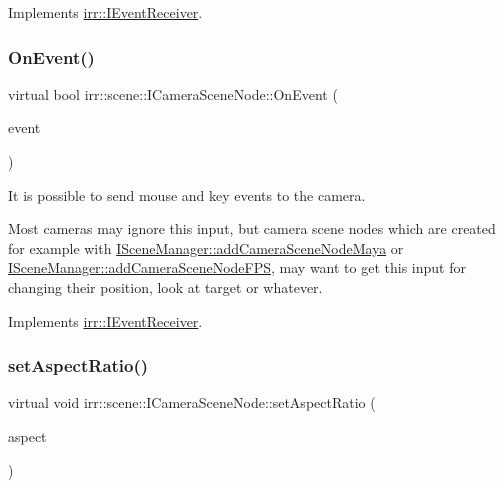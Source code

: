 Implements \hyperlink{classirr_1_1IEventReceiver_a571f744ceffc3b4fe8a81f529163eb97}{irr\+::\+I\+Event\+Receiver}.

\mbox{\label{classirr_1_1scene_1_1ICameraSceneNode_af27145518f43a17f803cdea086f68f3c}} 
\subsubsection{\texorpdfstring{On\+Event()}{OnEvent()}\hspace{0.1cm}{\footnotesize\ttfamily [2/2]}}
{\footnotesize\ttfamily virtual bool irr\+::scene\+::\+I\+Camera\+Scene\+Node\+::\+On\+Event (\begin{DoxyParamCaption}\item[{const \hyperlink{structirr_1_1SEvent}{S\+Event} \&}]{event }\end{DoxyParamCaption})\hspace{0.3cm}{\ttfamily [pure virtual]}}



It is possible to send mouse and key events to the camera. 

Most cameras may ignore this input, but camera scene nodes which are created for example with \hyperlink{classirr_1_1scene_1_1ISceneManager_a18e81a59e02231567ac938ea287fe523}{I\+Scene\+Manager\+::add\+Camera\+Scene\+Node\+Maya} or \hyperlink{classirr_1_1scene_1_1ISceneManager_ac312cbc85161678d00192880f2cdddbb}{I\+Scene\+Manager\+::add\+Camera\+Scene\+Node\+F\+PS}, may want to get this input for changing their position, look at target or whatever. 

Implements \hyperlink{classirr_1_1IEventReceiver_a571f744ceffc3b4fe8a81f529163eb97}{irr\+::\+I\+Event\+Receiver}.

\mbox{\label{classirr_1_1scene_1_1ICameraSceneNode_a5c3728a61a208376b9df6a701f4a5b3c}} 
\subsubsection{\texorpdfstring{set\+Aspect\+Ratio()}{setAspectRatio()}\hspace{0.1cm}{\footnotesize\ttfamily [1/2]}}
{\footnotesize\ttfamily virtual void irr\+::scene\+::\+I\+Camera\+Scene\+Node\+::set\+Aspect\+Ratio (\begin{DoxyParamCaption}\item[{\hyperlink{namespaceirr_a0277be98d67dc26ff93b1a6a1d086b07}{f32}}]{aspect }\end{DoxyParamCaption})\hspace{0.3cm}{\ttfamily [pure virtual]}}



